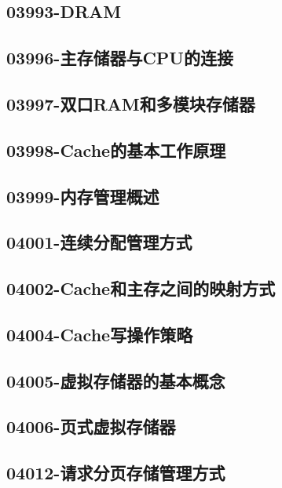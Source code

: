 \subsection{03993-DRAM}

\subsection{03996-主存储器与CPU的连接}

\subsection{03997-双口RAM和多模块存储器}

\subsection{03998-Cache的基本工作原理}

\subsection{03999-内存管理概述}

\subsection{04001-连续分配管理方式}

\subsection{04002-Cache和主存之间的映射方式}

\subsection{04004-Cache写操作策略}

\subsection{04005-虚拟存储器的基本概念}

\subsection{04006-页式虚拟存储器}

\subsection{04012-请求分页存储管理方式}

